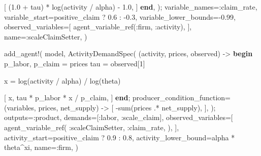 \documentclass[
  letterpaper,
  DIV=11,
  numbers=noendperiod]{scrreprt}
\newenvironment{Shaded}{\begin{snugshade}}{\end{snugshade}}
\newcommand{\ControlFlowTok}[1]{\textcolor[rgb]{0.00,0.23,0.31}{\textbf{#1}}}
\newcommand{\FloatTok}[1]{\textcolor[rgb]{0.68,0.00,0.00}{#1}}
\newcommand{\FunctionTok}[1]{\textcolor[rgb]{0.28,0.35,0.67}{#1}}
\newcommand{\NormalTok}[1]{\textcolor[rgb]{0.00,0.23,0.31}{#1}}
\newcommand{\OperatorTok}[1]{\textcolor[rgb]{0.37,0.37,0.37}{#1}}
\begin{document}
\begin{codelisting}
{\begin{Shaded}
\begin{Highlighting}[]
\NormalTok{            [}
\NormalTok{                (}\FloatTok{1.0} \OperatorTok{+}\NormalTok{ tau) }\OperatorTok{*} \FunctionTok{log}\NormalTok{(activity }\OperatorTok{/}\NormalTok{ alpha) }\OperatorTok{{-}} \FloatTok{1.0}\NormalTok{,}
\NormalTok{            ]}
        \ControlFlowTok{end}\NormalTok{,}
\NormalTok{    );}
\NormalTok{    variable\_names}\OperatorTok{=:}\NormalTok{claim\_rate,}
\NormalTok{    variable\_start}\OperatorTok{=}\NormalTok{positive\_claim ? }\FloatTok{0.6} \OperatorTok{:} \OperatorTok{{-}}\FloatTok{0.3}\NormalTok{,}
\NormalTok{    variable\_lower\_bounds}\OperatorTok{={-}}\FloatTok{0.99}\NormalTok{,}
\NormalTok{    observed\_variables}\OperatorTok{=}\NormalTok{[}
        \FunctionTok{agent\_variable\_ref}\NormalTok{(}\OperatorTok{:}\NormalTok{firm, }\OperatorTok{:}\NormalTok{activity),}
\NormalTok{    ],}
\NormalTok{    name}\OperatorTok{=:}\NormalTok{scaleClaimSetter,}
\NormalTok{)}

\FunctionTok{add\_agent!}\NormalTok{(}
\NormalTok{    model,}
    \FunctionTok{ActivityDemandSpec}\NormalTok{(}
\NormalTok{        (activity, prices, observed) }\OperatorTok{{-}\textgreater{}} \ControlFlowTok{begin}
\NormalTok{            p\_labor, p\_claim }\OperatorTok{=}\NormalTok{ prices}
\NormalTok{            tau }\OperatorTok{=}\NormalTok{ observed[}\FloatTok{1}\NormalTok{]}

\NormalTok{            x }\OperatorTok{=} \FunctionTok{log}\NormalTok{(activity }\OperatorTok{/}\NormalTok{ alpha) }\OperatorTok{/} \FunctionTok{log}\NormalTok{(theta)}

\NormalTok{            [}
\NormalTok{                x,}
\NormalTok{                tau }\OperatorTok{*}\NormalTok{ p\_labor }\OperatorTok{*}\NormalTok{ x }\OperatorTok{/}\NormalTok{ p\_claim,}
\NormalTok{            ]}
        \ControlFlowTok{end}\NormalTok{;}
\NormalTok{        producer\_condition\_function}\OperatorTok{=}
\NormalTok{            (variables, prices, net\_supply) }\OperatorTok{{-}\textgreater{}}\NormalTok{ [}
                \FunctionTok{{-}sum}\NormalTok{(prices }\OperatorTok{.*}\NormalTok{ net\_supply),}
\NormalTok{            ],}
\NormalTok{    );}
\NormalTok{    outputs}\OperatorTok{=:}\NormalTok{product,}
\NormalTok{    demands}\OperatorTok{=}\NormalTok{[}\OperatorTok{:}\NormalTok{labor, }\OperatorTok{:}\NormalTok{scale\_claim],}
\NormalTok{    observed\_variables}\OperatorTok{=}\NormalTok{[}
        \FunctionTok{agent\_variable\_ref}\NormalTok{(}
            \OperatorTok{:}\NormalTok{scaleClaimSetter,}
            \OperatorTok{:}\NormalTok{claim\_rate,}
\NormalTok{        ),}
\NormalTok{    ],}
\NormalTok{    activity\_start}\OperatorTok{=}\NormalTok{positive\_claim ? }\FloatTok{0.9} \OperatorTok{:} \FloatTok{0.8}\NormalTok{,}
\NormalTok{    activity\_lower\_bound}\OperatorTok{=}\NormalTok{alpha }\OperatorTok{*}\NormalTok{ theta}\OperatorTok{\^{}}\NormalTok{xi,}
\NormalTok{    name}\OperatorTok{=:}\NormalTok{firm,}
\NormalTok{)}


\end{Highlighting}
\end{Shaded}}
\end{codelisting}
\end{document}
